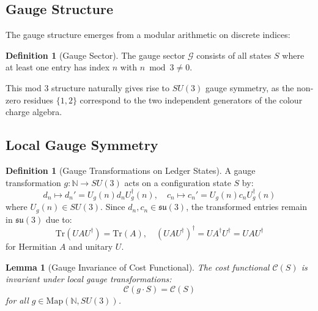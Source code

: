 \documentclass[11pt]{article}
\numberwithin{equation}{section}
\newtheorem{lemma}[theorem]{Lemma}
\theoremstyle{definition}
\newtheorem{definition}[theorem]{Definition}
\theoremstyle{remark}
\begin{document}
\subsection{Gauge Structure}

The gauge structure emerges from a modular arithmetic on discrete indices:

\begin{definition}[Gauge Sector]
The gauge sector $\mathcal{G}$ consists of all states $S$ where at least one entry has index $n$ with $n \bmod 3 \neq 0$.
\end{definition}

This mod 3 structure naturally gives rise to $SU(3)$ gauge symmetry, as the non-zero residues $\{1, 2\}$ correspond to the two independent generators of the colour charge algebra.

\subsection{Local Gauge Symmetry}

\begin{definition}[Gauge Transformations on Ledger States]
A gauge transformation $g: \mathbb{N} \to SU(3)$ acts on a configuration state $S$ by:
\begin{equation}
d_n \mapsto d_n' = U_g(n) d_n U_g^\dagger(n), \quad c_n \mapsto c_n' = U_g(n) c_n U_g^\dagger(n)
\end{equation}
where $U_g(n) \in SU(3)$. Since $d_n, c_n \in \mathfrak{su}(3)$, the transformed entries remain in $\mathfrak{su}(3)$ due to:
\begin{equation}
\text{Tr}(U A U^\dagger) = \text{Tr}(A), \quad (U A U^\dagger)^\dagger = U A^\dagger U^\dagger = U A U^\dagger
\end{equation}
for Hermitian $A$ and unitary $U$.
\end{definition}

\begin{lemma}[Gauge Invariance of Cost Functional]
The cost functional $\mathcal{C}(S)$ is invariant under local gauge transformations:
\begin{equation}
\mathcal{C}(g \cdot S) = \mathcal{C}(S)
\end{equation}
for all $g \in \text{Map}(\mathbb{N}, SU(3))$.
\end{lemma}
\end{document}
